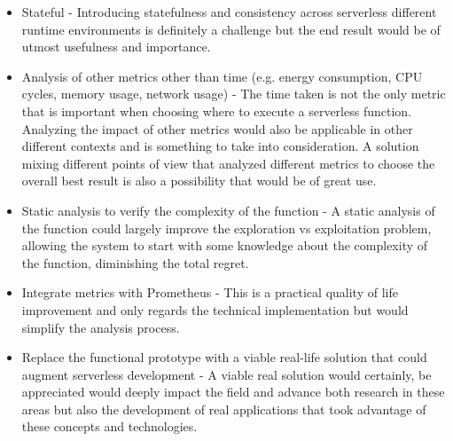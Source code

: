 \begin{itemize}
    \item Stateful - Introducing statefulness and consistency across serverless
        different runtime environments is definitely a challenge but the end result would be of utmost usefulness and importance.
    \item Analysis of other metrics other than time (e.g. energy consumption, CPU
        cycles, memory usage, network usage) - The time taken is not the only metric that is important when choosing where to execute a serverless function. Analyzing the impact of other metrics would also be applicable in other different contexts and is something to take into consideration.
        A solution mixing different points of view that analyzed different metrics to choose the overall best result is also a possibility that would be of great use.
    \item Static analysis to verify the complexity of the function - A static analysis
        of the function could largely improve the exploration vs exploitation problem, allowing the system to start with some knowledge about the complexity of the function, diminishing the total regret.
    \item Integrate metrics with Prometheus - This is a practical quality of life
        improvement and only regards the technical implementation but would simplify the analysis process.
    \item Replace the functional prototype with a viable real-life solution that
        could augment serverless development - A viable real solution would
        certainly, be appreciated would deeply impact the field and advance
        both research in these areas but also the development of real applications
        that took advantage of these concepts and technologies.
\end{itemize}
